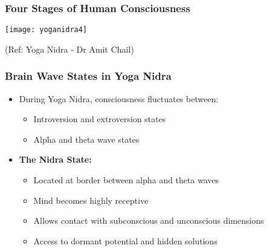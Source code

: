 \begin{frame}[fragile]\frametitle{Four Stages of Human Consciousness}
      \begin{center}
        \texttt{[image: yoganidra4]}

		{\tiny (Ref: Yoga Nidra - Dr Amit Chail)}		
        \end{center}

\end{frame}

\begin{frame}[fragile]\frametitle{Brain Wave States in Yoga Nidra}
    \begin{itemize}
        \item During Yoga Nidra, consciousness fluctuates between:
        \begin{itemize}
            \item Introversion and extroversion states
            \item Alpha and theta wave states
        \end{itemize}
        \item \textbf{The Nidra State:}
        \begin{itemize}
            \item Located at border between alpha and theta waves
            \item Mind becomes highly receptive
            \item Allows contact with subconscious and unconscious dimensions
            \item Access to dormant potential and hidden solutions
        \end{itemize}
    \end{itemize}
\end{frame}

